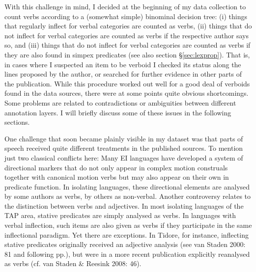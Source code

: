 With this challenge in mind, I decided at the beginning of my data collection to count verbs according to a (somewhat simple) binominal decision tree: (i) things that regularly inflect for verbal categories are counted as verbs, (ii) things that do not inflect for verbal categories are counted as verbs if the respective author says so, and (iii) things that do not inflect for verbal categories are counted as verbs if they are also found in simpex predicates (see also section §\ref{sec:lexprop}). That is, in cases where I suspected an item to be verboid I checked its status along the lines proposed by the author, or searched for further evidence in other parts of the publication. While this procedure worked out well for a good deal of verboids found in the data sources, there were at some points quite obvious shortcomings. Some problems are related to contradictions or ambiguities between different annotation layers. I will briefly discuss some of these issues in the following sections.

One challenge that soon became plainly visible in my dataset was that parts of speech received quite different treatments in the published sources. To mention just two classical conflicts here: Many EI languages have developed a system of directional markers that do not only appear in complex motion construals together with canonical motion verbs but may also appear on their own in predicate function. In isolating languages, these directional elements are analysed by some authors as verbs, by others as non-verbal. Another controversy relates to the distinction between verbs and adjectives. In most isolating languages of the TAP area, stative predicates are simply analysed as verbs. In languages with verbal inflection, such items are also given as verbs if they participate in the same inflectional paradigm. Yet there are exceptions. In Tidore, for instance, inflecting stative predicates originally received an adjective analysis (see van Staden 2000: 81 and following pp.), but were in a more recent publication explicitly reanalysed as verbs (cf. van Staden \& Reesink 2008: 46). 

